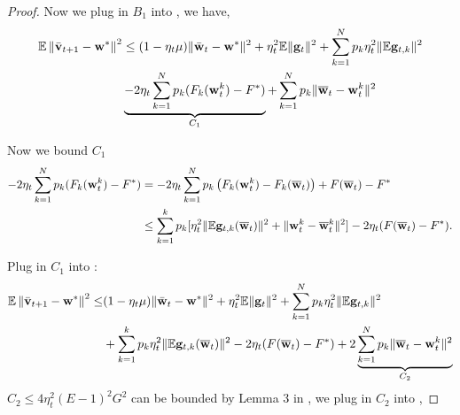 \begin{proof}
Now we plug in $B_1$ into \eq{\ref{eq:expand2}}, we have,
\begin{align}
	\mathbb{E}\left\|\bar{{\mathbf{v}}}_{t+1}-{\mathbf{w}}^{*}\right\|^2 & \leq (1 - \eta_t\mu)\|\bar{{\mathbf{w}}}_{t}-{\mathbf{w}}^{*}\|^{2} + \eta_{t}^{2} \mathbb{E}\| {\mathbf{g}}_{t} \|^{2} +  \sum_{k=1}^N p_k \eta_t^2 \|\mathbb{E} {\mathbf{g}}_{t,k}\|^2 \\
	& \underbrace{-2\eta_t\sum_{k=1}^N p_k (F_k({\mathbf{w}}_t^k) - F^*)}_{C_1} + \sum_{k=1}^N p_k \|\overline{{\mathbf{w}}}_t - {\mathbf{w}}_t^k\|^2 \label{eq:scvxnsmth2}
\end{align}

Now we bound $C_1$
\begin{align}
	-2\eta_t\sum_{k=1}^N p_k (F_k({\mathbf{w}}_t^k) - F^*) & = -2\eta_t\sum_{k=1}^N p_k \left(F_k({\mathbf{w}}_t^k) - F_k({\overline{\mathbf{w}}}_t)\right) + F({\overline{\mathbf{w}}}_t) -  F^*\\
& \leq \sum_{k=1}^{k} p_{k}[\eta_{t}^{2}\|\mathbb{E} {\mathbf{g}}_{t,k}({\overline{\mathbf{w}}}_{t})\|^{2}+\| {\mathbf{w}}_{t}^{k}-{\overline{\mathbf{w}}}_t^{k} \|^{2}]-2 \eta_{t}(F({\overline{\mathbf{w}}}_{t})- F^{*}). 
\end{align}

Plug in $C_1$ into \eq{\ref{eq:scvxnsmth2}}:
\begin{align}
	\mathbb{E}\left\|\bar{{\mathbf{v}}}_{t+1}-{\mathbf{w}}^{*}\right\|^2 \leq
	&  (1 - \eta_t\mu)\|\bar{{\mathbf{w}}}_{t}-{\mathbf{w}}^{*}\|^{2} + \eta_{t}^{2} \mathbb{E}\| {\mathbf{g}}_{t} \|^{2} +  \sum_{k=1}^N p_k \eta_t^2 \|\mathbb{E} {\mathbf{g}}_{t,k}\|^2 \\& + \sum_{k=1}^{k} p_{k}\eta_{t}^{2}\|\mathbb{E} {\mathbf{g}}_{t,k}({\overline{\mathbf{w}}}_{t})\|^{2}-2 \eta_{t}(F({\overline{\mathbf{w}}}_{t})- F^{*})  + 2 \underbrace{\sum_{k=1}^N p_k \|\overline{{\mathbf{w}}}_t - {\mathbf{w}}_t^k\|^2}_{C_2} \label{eq:scvxnsmth3}
\end{align}
$C_2 \leq  4\eta_t^2 (E-1)^2 G^2$ can be bounded by Lemma 3 in \cite{li2019convergence}, we plug in $C_2$ into \eq{\ref{eq:scvxnsmth3}},



\end{proof}
